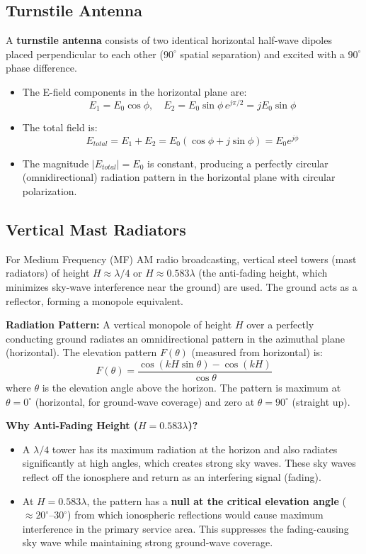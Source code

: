 \documentclass[12pt,a4paper]{article}
\begin{document}
\subsection{Turnstile Antenna}
A \textbf{turnstile antenna} consists of two identical horizontal half-wave dipoles placed perpendicular to each other ($90^\circ$ spatial separation) and excited with a $90^\circ$ phase difference.
\begin{itemize}[leftmargin=*, itemsep=2pt]
  \item The E-field components in the horizontal plane are:
  \[
  E_1 = E_0 \cos\phi, \quad E_2 = E_0 \sin\phi \, e^{j\pi/2} = j E_0 \sin\phi
  \]
  \item The total field is:
  \[
  E_{total} = E_1 + E_2 = E_0 (\cos\phi + j\sin\phi) = E_0 e^{j\phi}
  \]
  \item The magnitude $|E_{total}| = E_0$ is constant, producing a perfectly circular (omnidirectional) radiation pattern in the horizontal plane with circular polarization.
\end{itemize}

\subsection{Vertical Mast Radiators}
For Medium Frequency (MF) AM radio broadcasting, vertical steel towers (mast radiators) of height $H \approx \lambda/4$ or $H \approx 0.583\lambda$ (the anti-fading height, which minimizes sky-wave interference near the ground) are used. The ground acts as a reflector, forming a monopole equivalent.

\textbf{Radiation Pattern:} A vertical monopole of height $H$ over a perfectly conducting ground radiates an omnidirectional pattern in the azimuthal plane (horizontal). The elevation pattern $F(\theta)$ (measured from horizontal) is:
\[
F(\theta) = \frac{\cos(kH\sin\theta) - \cos(kH)}{\cos\theta}
\]
where $\theta$ is the elevation angle above the horizon. The pattern is maximum at $\theta = 0^\circ$ (horizontal, for ground-wave coverage) and zero at $\theta = 90^\circ$ (straight up).

\textbf{Why Anti-Fading Height ($H = 0.583\lambda$)?}
\begin{itemize}[leftmargin=*, itemsep=3pt]
  \item A $\lambda/4$ tower has its maximum radiation at the horizon and also radiates significantly at high angles, which creates strong sky waves. These sky waves reflect off the ionosphere and return as an interfering signal (fading).
  \item At $H = 0.583\lambda$, the pattern has a \textbf{null at the critical elevation angle} ($\approx 20^\circ$–$30^\circ$) from which ionospheric reflections would cause maximum interference in the primary service area. This suppresses the fading-causing sky wave while maintaining strong ground-wave coverage.
\end{itemize}
\end{document}
